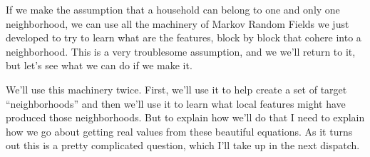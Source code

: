 \documentclass{article}
\begin{document}
If we make the assumption that a household can belong to one and only
one neighborhood, we can use all the machinery of Markov Random Fields
we just developed to try to learn what are the features, block by
block that cohere into a neighborhood. This is a very troublesome
assumption, and we we'll return to it, but let's see what we can do
if we make it.

We'll use this machinery twice. First, we'll use it to help create a
set of target ``neighborhoods'' and then we'll use it to learn what
local features might have produced those neighborhoods. But to explain
how we'll do that I need to explain how we go about getting real
values from these beautiful equations. As it turns out this is a pretty 
complicated question, which I'll take up in the next dispatch.
\end{document}
